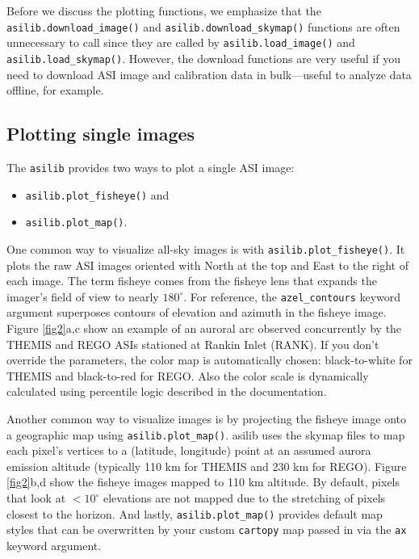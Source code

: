 \documentclass[draft]{agujournal2019}
\begin{document}
Before we discuss the plotting functions, we emphasize that the \verb|asilib.download_image()| and \verb|asilib.download_skymap()| functions are often unnecessary to call since they are called by \verb|asilib.load_image()| and \verb|asilib.load_skymap()|. However, the download functions are very useful if you need to download ASI image and calibration data in bulk---useful to analyze data offline, for example.

\subsection{Plotting single images}

The \verb|asilib| provides two ways to plot a single ASI image:

\begin{itemize}
      \item \verb|asilib.plot_fisheye()| and
      \item \verb|asilib.plot_map()|.
\end{itemize}

One common way to visualize all-sky images is with \verb|asilib.plot_fisheye()|. It plots the raw ASI images oriented with North at the top and East to the right of each image. The term fisheye comes from the fisheye lens that expands the imager's field of view to nearly $180^\circ$. For reference, the \verb|azel_contours| keyword argument superposes contours of elevation and azimuth in the fisheye image. Figure \ref{fig2}a,c show an example of an auroral arc observed concurrently by the THEMIS and REGO ASIs stationed at Rankin Inlet (RANK). If you don't override the parameters, the color map is automatically chosen: black-to-white for THEMIS and black-to-red for REGO. Also the color scale is dynamically calculated using percentile logic described in the documentation.

Another common way to visualize images is by projecting the fisheye image onto a geographic map using \verb|asilib.plot_map()|. asilib uses the skymap files to map each pixel's vertices to a (latitude, longitude) point at an assumed aurora emission altitude (typically 110 km for THEMIS and 230 km for REGO). Figure \ref{fig2}b,d show the fisheye images mapped to 110 km altitude. By default, pixels that look at $< 10^\circ$ elevations are not mapped due to the stretching of pixels closest to the horizon. And lastly, \verb|asilib.plot_map()| provides default map styles that can be overwritten by your custom \verb|cartopy| map passed in via the \verb|ax| keyword argument.
\end{document}
